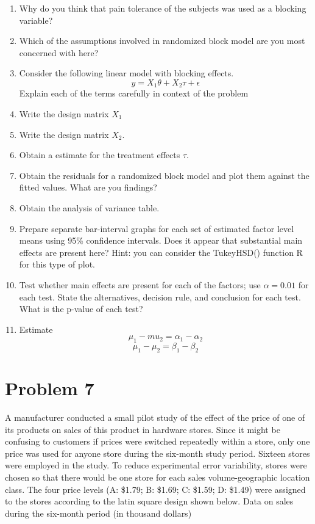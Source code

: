 \documentclass{article}
\begin{document}
\begin{enumerate}
	\item Why do you think that pain tolerance of the subjects was used as a blocking variable?
	\item Which of the assumptions involved in randomized block model are you most concerned with here?
	\item Consider the following linear model with blocking effects.
	      $$
		      y=X_1 \theta + X_2 \tau + \epsilon
	      $$
	      Explain each of the terms carefully in context of the problem
	\item Write the design matrix $X_1$
	\item Write the design matrix $X_2$.
	\item Obtain a estimate for the treatment effects $\hat{\tau}$.
	\item Obtain the residuals for a randomized block model and plot them against the fitted values.
	      What are you findings?
	\item Obtain the analysis of variance table.
	\item Prepare separate bar-interval graphs for each set of estimated factor level means using 95\%
	      confidence intervals. Does it appear that substantial main effects are present here? Hint: you
	      can consider the TukeyHSD() function R for this type of plot.
	\item Test whether main effects are present for each of the factors; use $\alpha = 0.01$ for each test. State
	      the alternatives, decision rule, and conclusion for each test. What is the p-value of each test?
	\item Estimate
	      $$
		      \mu_1 - mu_2 = \alpha_1 - \alpha_2
	      $$
	      $$
		      \mu_1 - \mu_2 = \beta_1 - \beta_2
	      $$
\end{enumerate}

\section{Problem 7}
A manufacturer conducted a small pilot study of the effect of the price of one of its products on
sales of this product in hardware stores. Since it might be confusing to customers if prices were
switched repeatedly within a store, only one price was used for anyone store during the six-month
study period. Sixteen stores were employed in the study. To reduce experimental error variability,
stores were chosen so that there would be one store for each sales volume-geographic location class.
The four price levels (A: \$1.79; B: \$1.69; C: \$1.59; D: \$1.49) were assigned to the stores according
to the latin square design shown below. Data on sales during the six-month period (in thousand
dollars)
\end{document}
